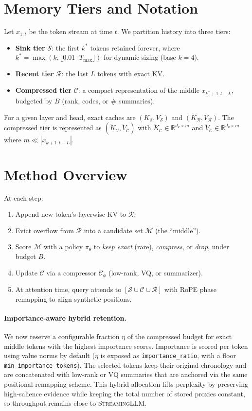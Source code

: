 \documentclass[11pt]{article}
\newcommand{\streaming}{\textsc{StreamingLLM}}
\newcommand{\kv}{KV}
\newcommand{\sink}{\mathcal{S}}
\newcommand{\recent}{\mathcal{R}}
\newcommand{\compressed}{\mathcal{C}}
\begin{document}
\section{Memory Tiers and Notation}
Let $x_{1:t}$ be the token stream at time $t$. We partition history into three tiers:
\begin{itemize}
  \item \textbf{Sink tier} $\sink$: the first $k^*$ tokens retained forever, where $k^* = \max(k, \lfloor 0.01 \cdot T_{\max}\rfloor)$ for dynamic sizing (base $k=4$).
  \item \textbf{Recent tier} $\recent$: the last $L$ tokens with exact \kv{}.
  \item \textbf{Compressed tier} $\compressed$: a compact representation of the middle $x_{k^*+1:t-L}$, budgeted by $B$ (rank, codes, or \# summaries).
\end{itemize}
For a given layer and head, exact caches are $(K_{\sink}, V_{\sink})$ and $(K_{\recent}, V_{\recent})$. The compressed tier is represented as $(\tilde K_{\compressed}, \tilde V_{\compressed})$ with $\tilde K_{\compressed} \in \mathbb{R}^{d_k \times m}$ and $\tilde V_{\compressed} \in \mathbb{R}^{d_v \times m}$ where $m \ll |x_{k+1:t-L}|$.

\section{Method Overview}
At each step:
\begin{enumerate}
  \item Append new token's layerwise \kv{} to $\recent$.
  \item Evict overflow from $\recent$ into a candidate set $\mathcal{M}$ (the ``middle'').
  \item Score $\mathcal{M}$ with a policy $\pi_\theta$ to \emph{keep exact} (rare), \emph{compress}, or \emph{drop}, under budget $B$.
  \item Update $\compressed$ via a compressor $\mathcal{C}_\phi$ (low-rank, VQ, or summarizer).
  \item At attention time, query attends to $[\sink \cup \compressed \cup \recent]$ with RoPE phase remapping to align synthetic positions.
\end{enumerate}

\paragraph{Importance-aware hybrid retention.}
We now reserve a configurable fraction $\eta$ of the compressed budget for exact
middle tokens with the highest importance scores. Importance is scored per token
using value norms by default ($\eta$ is exposed as \texttt{importance\_ratio},
with a floor \texttt{min\_importance\_tokens}). The selected tokens keep their
original chronology and are concatenated with low-rank or VQ summaries that are
anchored via the same positional remapping scheme. This hybrid allocation lifts
perplexity by preserving high-salience evidence while keeping the total number
of stored proxies constant, so throughput remains close to \streaming{}.
\end{document}
